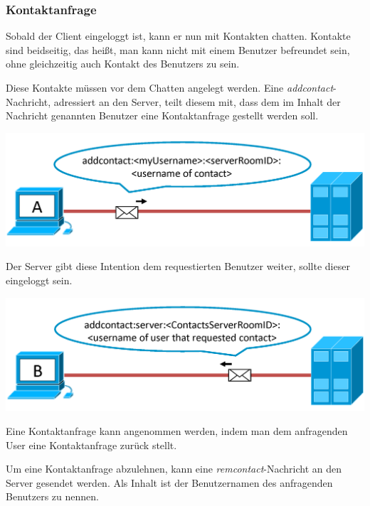 \documentclass[12pt,a4paper,bibliography=totocnumbered,listof=totocnumbered]{scrartcl}
\begin{document}
\subsubsection{Kontaktanfrage}
Sobald der Client eingeloggt ist, kann er nun mit Kontakten chatten. Kontakte sind beidseitig, das heißt, man kann nicht mit einem Benutzer befreundet sein, ohne gleichzeitig auch Kontakt des Benutzers zu sein.

Diese Kontakte müssen vor dem Chatten angelegt werden. Eine \textit{addcontact}-Nachricht, adressiert an den Server, teilt diesem mit, dass dem im Inhalt der Nachricht genannten Benutzer eine Kontaktanfrage gestellt werden soll.

\vspace{1em}
\begin{minipage}{\linewidth}
	\centering
	\includegraphics[width=0.7\linewidth]{img/addcontact1.png}
	\label{fig:addcontact1}
\end{minipage}
\vspace{0.5em} 

Der Server gibt diese Intention dem requestierten Benutzer weiter, sollte dieser eingeloggt sein.

\vspace{1em}
\begin{minipage}{\linewidth}
	\centering
	\includegraphics[width=0.7\linewidth]{img/addcontact2.png}
	\label{fig:addcontact2}
\end{minipage}
\vspace{0.5em}

Eine Kontaktanfrage kann angenommen werden, indem man dem anfragenden User eine Kontaktanfrage zurück stellt.

Um eine Kontaktanfrage abzulehnen, kann eine \textit{remcontact}-Nachricht an den Server gesendet werden. Als Inhalt ist der Benutzernamen des anfragenden Benutzers zu nennen.
\end{document}
